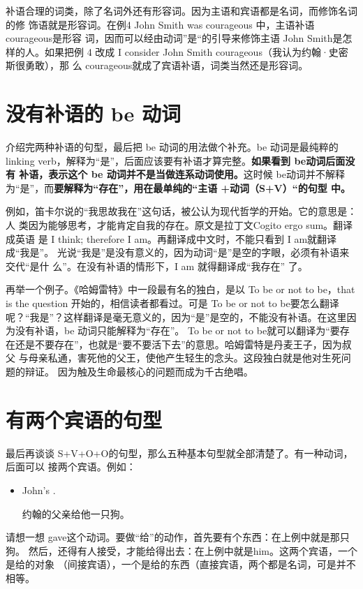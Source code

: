 补语合理的词类，除了名词外还有形容词。因为主语和宾语都是名词，而修饰名词的修
饰语就是形容词。在例4 John Smith was courageous 中，主语补语 courageous是形容
词，因而可以经由动词”是“的引导来修饰主语 John Smith是怎样的人。如果把例 4
改成 I consider John Smith courageous（我认为约翰·史密斯很勇敢），那
么 courageous就成了宾语补语，词类当然还是形容词。

\section{没有补语的 be 动词}

介绍完两种补语的句型，最后把 be 动词的用法做个补充。be 动词是最纯粹的linking
verb，解释为“是”，后面应该要有补语才算完整。\textbf{如果看到 be动词后面没有
  补语，表示这个 be 动词并不是当做连系动词使用。}这时候 be动词并不解释
为“是”，而\textbf{要解释为“存在”，用在最单纯的“主语 +动词（S+V）“的句型
  中。}

例如，笛卡尔说的“我思故我在”这句话，被公认为现代哲学的开始。它的意思是：人
类因为能够思考，才能肯定自我的存在。原文是拉丁文Cogito ergo sum。翻译成英语
是 I think; therefore I am。再翻译成中文时，不能只看到 I am就翻译成“我是”。
光说“我是”是没有意义的，因为动词“是”是空的字眼，必须有补语来交代“是什
么”。在没有补语的情形下，I am 就得翻译成“我存在” 了。

再举一个例子。《哈姆雷特》中一段最有名的独白，是以 To be or not to be，that
is the question 开始的，相信读者都看过。可是 To be or not to be要怎么翻译
呢？“我是”？这样翻译是毫无意义的，因为“是”是空的，不能没有补语。在这里因
为没有补语，be 动词只能解释为“存在”。 To be or not to be就可以翻译为“要存
在还是不要存在”，也就是“要不要活下去”的意思。哈姆雷特是丹麦王子，因为叔父
与母亲私通，害死他的父王，使他产生轻生的念头。这段独白就是他对生死问题的辩证。
因为触及生命最核心的问题而成为千古绝唱。

\section{有两个宾语的句型}

最后再谈谈 S+V+O+O的句型，那么五种基本句型就全部清楚了。有一种动词，后面可以
接两个宾语。例如：
\begin{itemize}
\item John's    .

  约翰的父亲给他一只狗。
\end{itemize}

请想一想 gave这个动词。要做“给”的动作，首先要有个东西：在上例中就是那只狗。
然后，还得有人接受，才能给得出去：在上例中就是him。这两个宾语，一个是给的对象
（间接宾语），一个是给的东西（直接宾语，两个都是名词，可是并不相等。

